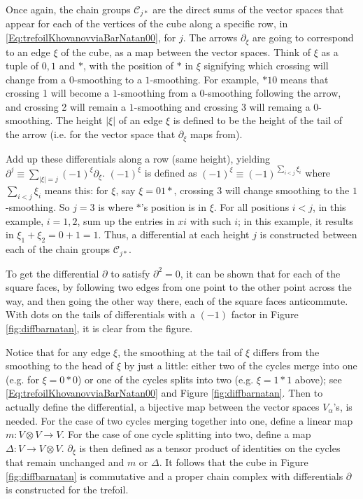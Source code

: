 \documentclass[a4paper,titlepage,twoside]{book}
\begin{document}
Once again, the chain groups $\mathcal{C}_{j*}$ are the direct sums of the vector spaces that appear for each of the vertices of the cube along a specific row, in \eqref{Eq:trefoilKhovanovviaBarNatan00}, for $j$.  The arrows $\partial_{\xi}$ are going to correspond to an edge $\xi$ of the cube, as a map between the vector spaces.  Think of $\xi$ as a tuple of $0,1$ and $*$, with the position of $*$ in $\xi$ signifying which crossing will change from a $0$-smoothing to a $1$-smoothing.  For example, $*10$ means that crossing 1 will become a $1$-smoothing from a $0$-smoothing following the arrow, and crossing 2 will remain a $1$-smoothing and crossing 3 will remaing a $0$-smoothing.  The height $|\xi|$ of an edge $\xi$ is defined to be the height of the tail of the arrow (i.e. for the vector space that $\partial_{\xi}$ maps from).  

Add up these differentials along a row (same height), yielding $\partial^j \equiv \sum_{ |\xi |=j} (-1)^{\xi}\partial_{\xi}$.  $(-1)^{\xi}$ is defined as $(-1)^{\xi} \equiv (-1)^{\sum_{i<j} \xi_i}$ where $\sum_{i<j} \xi_i$ means this: for $\xi$, say $\xi = 01*$, crossing 3 will change smoothing to the $1$-smoothing.  So $j=3$ is where $*$'s position is in $\xi$.  For all positions $i <j$, in this example, $i=1,2$, sum up the entries in $xi$ with such $i$; in this example, it results in $\xi_1 + \xi_2 = 0 + 1 = 1$.  Thus, a differential at each height $j$ is constructed between each of the chain groups $\mathcal{C}_{j*}$.

To get the differential $\partial$ to satisfy $\partial^2=0$, it can be shown that for each of the square faces, by following two edges from one point to the other point across the way, and then going the other way there, each of the square faces anticommute.  With dots on the tails of differentials with a $(-1)$ factor in Figure \ref{fig:diffbarnatan}, it is clear from the figure.

Notice that for any edge $\xi$, the smoothing at the tail of $\xi$ differs from the smoothing to the head of $\xi$ by just a little: either two of the cycles merge into one (e.g. for $\xi = 0*0$) or one of the cycles splits into two (e.g. $\xi = 1*1$ above); see \eqref{Eq:trefoilKhovanovviaBarNatan00} and Figure \ref{fig:diffbarnatan}.  Then to actually define the differential, a bijective map between the vector spaces $V_{\alpha}$'s, is needed. For the case of two cycles merging together into one, define a linear map $m:V \otimes V \to V$.  For the case of one cycle splitting into two, define a map $\Delta:V\to V \otimes V$.  $\partial_{\xi}$ is then defined as a tensor product of identities on the cycles that remain unchanged and $m$ or $\Delta$.  It follows that the cube in Figure \ref{fig:diffbarnatan} is commutative and a proper chain complex with differentials $\partial$ is constructed for the trefoil.  
\end{document}
